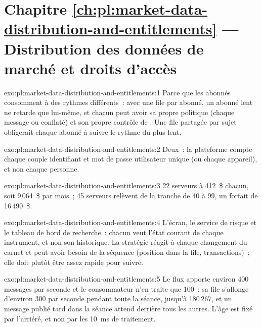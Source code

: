 \section*{Chapitre \ref{ch:pl:market-data-distribution-and-entitlements} --- Distribution des données de marché et droits d'accès}

\begin{solution}{exo:pl:market-data-distribution-and-entitlements:1}
Parce que les abonnés consomment à des rythmes différents~: avec une file par abonné, un abonné lent ne retarde que lui-même, et chacun peut avoir sa propre politique
(chaque message ou conflaté) et son propre contrôle de . Une file partagée par sujet obligerait chaque abonné à suivre le rythme du plus lent.
\end{solution}

\begin{solution}{exo:pl:market-data-distribution-and-entitlements:2}
Deux~: la plateforme compte chaque couple identifiant et mot de passe utilisateur unique (ou chaque appareil), et non chaque personne.
\end{solution}

\begin{solution}{exo:pl:market-data-distribution-and-entitlements:3}
22 serveurs à 412~\$ chacun, soit 9\,064~\$ par mois~; 45 serveurs relèvent de la tranche de 40 à 99, un forfait de 16\,490~\$.
\end{solution}

\begin{solution}{exo:pl:market-data-distribution-and-entitlements:4}
L'écran, le service de risque et le tableau de bord de recherche~: chacun veut l'état courant de chaque instrument, et non son historique. La stratégie
réagit à chaque changement du carnet et peut avoir besoin de la séquence (position dans la file, transactions)~; elle doit plutôt être assez rapide pour suivre.
\end{solution}

\begin{solution}{exo:pl:market-data-distribution-and-entitlements:5}
Le flux apporte environ 400 messages par seconde et le consommateur n'en traite que 100~: sa file s'allonge d'environ 300 par seconde pendant toute la séance, jusqu'à 180\,267,
et un message publié tard dans la séance attend derrière tous les autres. L'âge est fixé par l'arriéré, et non par les 10~ms de traitement.
\end{solution}

